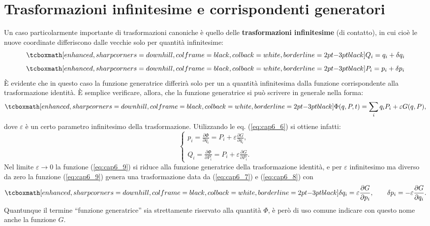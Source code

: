\section[Trasformazioni infinitesime e corrispondenti generatori]{Trasformazioni infinitesime e corrispondenti generatori}
Un caso particolarmente importante di trasformazioni canoniche è quello delle \textbf{trasformazioni infinitesime} (di contatto), in cui cioè le nuove coordinate differiscono dalle vecchie solo per quantità infinitesime:
	\begin{equation}
		\tcboxmath[enhanced, sharp corners=downhill, colframe=black, colback=white, borderline={2pt}{-3pt}{black}]{
			Q_i = q_i + \delta q _i
			}
		\label{eq:cap6_7}
	\end{equation}
	\begin{equation}
		\tcboxmath[enhanced, sharp corners=downhill, colframe=black, colback=white, borderline={2pt}{-3pt}{black}]{
			P_i = p_i + \delta p _i
			}
		\label{eq:cap6_8} 
	\end{equation}
È evidente che in questo caso la funzione generatrice differirà solo per un a quantità infinitesima dalla funzione corrispondente alla trasformazione identità. È semplice verificare, allora, che la funzione generatrice si può scrivere in generale nella forma:
	\begin{equation}
		\tcboxmath[enhanced, sharp corners=downhill, colframe=black, colback=white, borderline={2pt}{-3pt}{black}]{
			\Phi(q, P, t) = \sum _i q_iP_i +\varepsilon G(q, P) ,
			}
		\label{eq:cap6_9}
	\end{equation}
dove $\varepsilon $ è un certo parametro infinitesimo della trasformazione. Utilizzando le eq. (\ref{eq:cap6_6}) si ottiene infatti:
	\begin{equation}
		\begin{cases}
		\displaystyle{p_i= \frac{\partial \Phi}{\partial q_i} = P_i + \varepsilon \frac{\partial G}{\partial q_i }, }\\
		\\
		\displaystyle{Q_i= \frac{\partial \Phi}{\partial P_i} = P_i + \varepsilon \frac{\partial G}{\partial P_i }.}
		\end{cases}
	\end{equation}
Nel limite $\varepsilon \rightarrow 0$ la funzione (\ref{eq:cap6_9}) si riduce alla funzione generatrice della trasformazione identità, e per $\varepsilon$ infinitesimo ma diverso da zero la funzione (\ref{eq:cap6_9}) genera una trasformazione data da (\ref{eq:cap6_7}) e (\ref{eq:cap6_8}) con
	\begin{equation}
		\tcboxmath[enhanced, sharp corners=downhill, colframe=black, colback=white, borderline={2pt}{-3pt}{black}]{
			\delta q_i = \varepsilon \frac{\partial G}{\partial p_i },\qquad \delta p _i = -\varepsilon \frac{\partial G}{\partial q_i } .
			}
		\label{eq:cap6_11}
	\end{equation}	
Quantunque il termine  ``funzione generatrice''  sia strettamente riservato alla quantità $\Phi$, è però di uso comune indicare con questo nome anche la funzione $G$.\\

